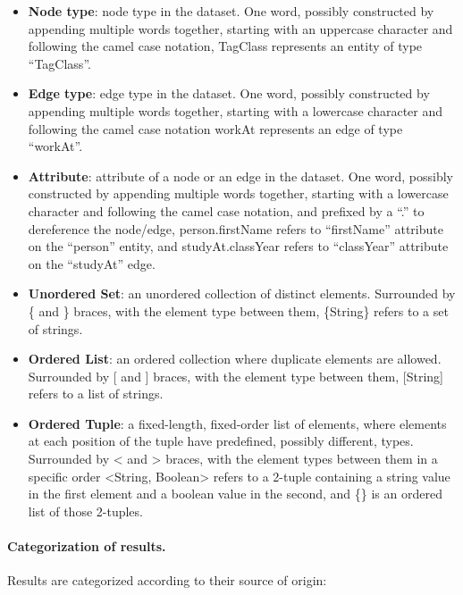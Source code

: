 \begin{itemize}
	\item \textbf{Node type}: node type in the dataset.
		One word, possibly constructed by appending multiple words together, starting with an uppercase character and following the camel case notation,
        \eg \textsf{TagClass} represents an entity of type ``TagClass''.
    \item \textbf{Edge type}: edge type in the dataset.
        One word, possibly constructed by appending multiple words together, starting with a lowercase character and following the camel case notation
        \eg \mbox{\textsf{workAt}} represents an edge of type ``workAt''.
    \item \textbf{Attribute}: attribute of a node or an edge in the dataset.
        One word, possibly constructed by appending multiple words together, starting with a lowercase character and following the camel case notation,
        and prefixed by a ``.'' to dereference the node/edge,
        \eg \textsf{person.firstName} refers to ``firstName'' attribute on the ``person'' entity,
        and \mbox{\textsf{studyAt.classYear}} refers to ``classYear'' attribute on the ``studyAt'' edge.
    \item \textbf{Unordered Set}: an unordered collection of distinct elements.
        Surrounded by \{ and \} braces, with the element type between them,
        \eg \textsf{\{String\}} refers to a set of strings.
    \item \textbf{Ordered List}: an ordered collection where duplicate elements are allowed.
        Surrounded by [ and ] braces, with the element type between them,
        \eg \textsf{[String]} refers to a list of strings.
    \item \textbf{Ordered Tuple}: a fixed-length, fixed-order list of elements, where elements at each position of the tuple have predefined, possibly different, types.
        Surrounded by < and > braces, with the element types between them in a specific order
        \eg \textsf{<String, Boolean>} refers to a 2-tuple containing a string value in the first element and a boolean value in the second,
        and \textsf{\{<String, Boolean>\}} is an ordered list of those 2-tuples.
\end{itemize}

\paragraph{Categorization of results.} Results are categorized according to their source of origin:

